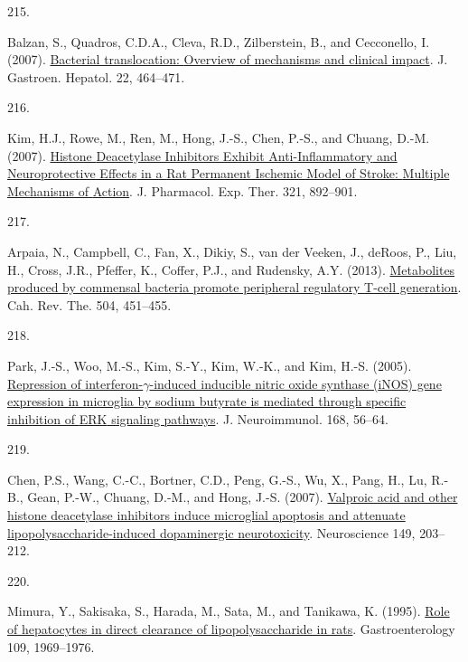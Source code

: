 \documentclass[
]{article}
\newlength{\cslhangindent}
\newlength{\csllabelwidth}
\newlength{\cslentryspacingunit} %
\newenvironment{CSLReferences}[2] %
 {%
  \setlength{\parindent}{0pt}
  \ifodd #1
  \let\oldpar\par
  \def\par{\hangindent=\cslhangindent\oldpar}
  \fi
  \setlength{\parskip}{#2\cslentryspacingunit}
 }%
 {}
\newcommand{\CSLLeftMargin}[1]{\parbox[t]{\csllabelwidth}{#1}}
\newcommand{\CSLRightInline}[1]{\parbox[t]{\linewidth - \csllabelwidth}{#1}\break}
\begin{document}
\begin{CSLReferences}{0}{0}
\leavevmode{}%
\CSLLeftMargin{215. }
\CSLRightInline{Balzan, S., Quadros, C.D.A., Cleva, R.D., Zilberstein, B., and Cecconello, I. (2007). \href{https://doi.org/10.1111/j.1440-1746.2007.04933.x}{Bacterial translocation: {Overview} of mechanisms and clinical impact}. J. Gastroen. Hepatol. 22, 464--471.}

\leavevmode{}%
\CSLLeftMargin{216. }
\CSLRightInline{Kim, H.J., Rowe, M., Ren, M., Hong, J.-S., Chen, P.-S., and Chuang, D.-M. (2007). \href{https://doi.org/10.1124/jpet.107.120188}{Histone {Deacetylase Inhibitors Exhibit Anti-Inflammatory} and {Neuroprotective Effects} in a {Rat Permanent Ischemic Model} of {Stroke}: {Multiple Mechanisms} of {Action}}. J. Pharmacol. Exp. Ther. 321, 892--901.}

\leavevmode{}%
\CSLLeftMargin{217. }
\CSLRightInline{Arpaia, N., Campbell, C., Fan, X., Dikiy, S., van der Veeken, J., deRoos, P., Liu, H., Cross, J.R., Pfeffer, K., Coffer, P.J., and Rudensky, A.Y. (2013). \href{https://doi.org/10.1038/nature12726}{Metabolites produced by commensal bacteria promote peripheral regulatory {T-cell} generation}. Cah. Rev. The. 504, 451--455.}

\leavevmode{}%
\CSLLeftMargin{218. }
\CSLRightInline{Park, J.-S., Woo, M.-S., Kim, S.-Y., Kim, W.-K., and Kim, H.-S. (2005). \href{https://doi.org/10.1016/j.jneuroim.2005.07.003}{Repression of interferon-{\(\gamma\)}-induced inducible nitric oxide synthase ({iNOS}) gene expression in microglia by sodium butyrate is mediated through specific inhibition of {ERK} signaling pathways}. J. Neuroimmunol. 168, 56--64.}

\leavevmode{}%
\CSLLeftMargin{219. }
\CSLRightInline{Chen, P.S., Wang, C.-C., Bortner, C.D., Peng, G.-S., Wu, X., Pang, H., Lu, R.-B., Gean, P.-W., Chuang, D.-M., and Hong, J.-S. (2007). \href{https://doi.org/10.1016/j.neuroscience.2007.06.053}{Valproic acid and other histone deacetylase inhibitors induce microglial apoptosis and attenuate lipopolysaccharide-induced dopaminergic neurotoxicity}. Neuroscience 149, 203--212.}

\leavevmode{}%
\CSLLeftMargin{220. }
\CSLRightInline{Mimura, Y., Sakisaka, S., Harada, M., Sata, M., and Tanikawa, K. (1995). \href{https://doi.org/10.1016/0016-5085(95)90765-3}{Role of hepatocytes in direct clearance of lipopolysaccharide in rats}. Gastroenterology 109, 1969--1976.}


\end{CSLReferences}
\end{document}
